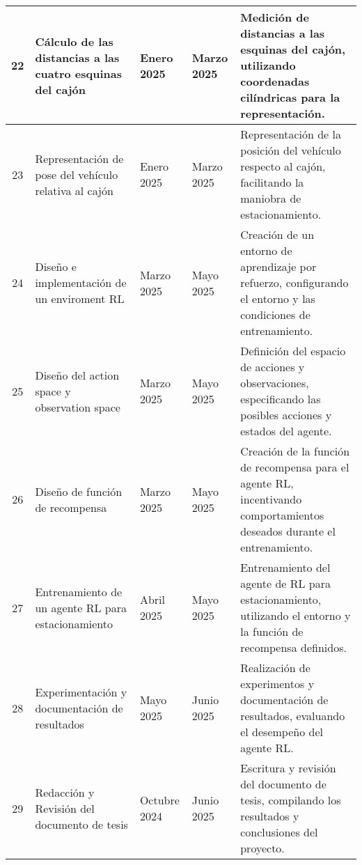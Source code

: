 \begin{center}
\begin{tabularx}{\textwidth}{|c|p{4cm}|p{1cm}|p{1cm}|X|}
        \hline
        22 & Cálculo de las distancias a las cuatro esquinas del cajón & Enero 2025 & Marzo 2025 & Medición de distancias a las esquinas del cajón, utilizando coordenadas cilíndricas para la representación. \\
        \hline
        23 & Representación de pose del vehículo relativa al cajón & Enero 2025 & Marzo 2025 & Representación de la posición del vehículo respecto al cajón, facilitando la maniobra de estacionamiento. \\
        \hline
        24 & Diseño e implementación de un enviroment RL & Marzo 2025 & Mayo 2025 & Creación de un entorno de aprendizaje por refuerzo, configurando el entorno y las condiciones de entrenamiento. \\
        \hline
        25 & Diseño del action space y observation space & Marzo 2025 & Mayo 2025 & Definición del espacio de acciones y observaciones, especificando las posibles acciones y estados del agente. \\
        \hline
        26 & Diseño de función de recompensa & Marzo 2025 & Mayo 2025 & Creación de la función de recompensa para el agente RL, incentivando comportamientos deseados durante el entrenamiento. \\
        \hline
        27 & Entrenamiento de un agente RL para estacionamiento & Abril 2025 & Mayo 2025 & Entrenamiento del agente de RL para estacionamiento, utilizando el entorno y la función de recompensa definidos. \\
        \hline
        28 & Experimentación y documentación de resultados & Mayo 2025 & Junio 2025 & Realización de experimentos y documentación de resultados, evaluando el desempeño del agente RL. \\
        \hline
        29 & Redacción y Revisión del documento de tesis & Octubre 2024 & Junio 2025 & Escritura y revisión del documento de tesis, compilando los resultados y conclusiones del proyecto. \\
        \hline
    \end{tabularx}
\end{center}